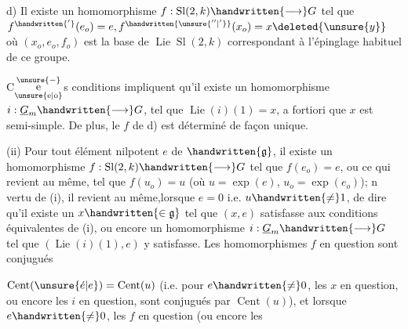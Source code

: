 d) Il existe un homomorphisme $f:\operatorname{Sl}(2,k)\handwritten{\longrightarrow}G$ tel que $f^{\handwritten{'}}(e_o)=e,f^{\handwritten{\unsure{''|'}}}(x_o)=x\deleted{\unsure{y}}$ où $(x_o,e_o,f_o)$ est la base de $\operatorname{Lie}\operatorname{Sl}(2,k)$ correspondant à l'épinglage habituel de ce groupe.

C$\overset{\unsure{-}}{\underset{\text{\unsure{e|o}}}{\text{e}}}$s conditions impliquent qu'il existe un homomorphisme $i:\underline{G}_m\handwritten{\longrightarrow}G$, tel que $\operatorname{Lie}(i)(1)=x$, a fortiori que $x$ est semi-simple. De plus, le $f$ de d) est déterminé de façon unique.

(ii) Pour tout élément nilpotent $e$ de $\handwritten{\mathfrak{g}}$, il existe un homomorphisme $f:\operatorname{Sl}(2,k)\handwritten{\longrightarrow}G$ tel que $f(e_o)=e$, ou ce qui revient au même, tel que $f(u_o)=u$ (où $u=\exp(e)$, $u_o=\exp(e_o)$); n vertu de (i), il revient au même,\deleted{\unsure{(}}lorsque $e=0$ i\handwritten{\unsure{/}}.e. $u\handwritten{\ne}1$, de dire qu'il existe un $x\handwritten{\in\mathfrak{g}}$ tel que $(x,e)$ satisfasse aux conditions équivalentes de (i), ou encore un homomorphisme $i:\underline{G}_m\handwritten{\longrightarrow}G$ tel que $(\operatorname{Lie}(i)(1),e)$ y satisfasse. Les homomorphismes $f$ en question sont conjugués
$\operatorname{Cent}(\unsure{\acute e|e})=\operatorname{Cent}(u)$ (i.e. pour $e\handwritten{\ne}0$, les $x$ en question, ou encore les $i$ en question, sont conjugués  par $\operatorname{Cent}(u)$), et lorsque $e\handwritten{\ne}0$, les $f$ en question (ou encore les
